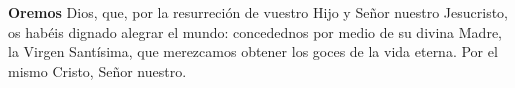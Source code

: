 \textbf{Oremos}
Dios, que, por la resurreción de vuestro Hijo y Señor nuestro Jesucristo, os habéis dignado alegrar el mundo: 
concedednos por medio de su divina Madre, la Virgen Santísima, que merezcamos obtener los goces de la vida eterna. 
Por el mismo Cristo, Señor nuestro. 